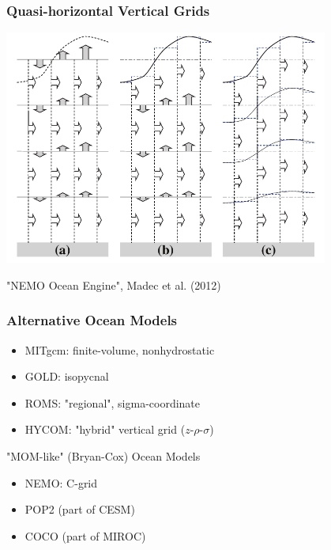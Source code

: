\documentclass[red]{beamer}
\begin{document}
\begin{frame}
    \frametitle{Quasi-horizontal Vertical Grids}
    
    \begin{center}
        \includegraphics[width=0.8\textwidth]{zstar.pdf}
    \end{center}
    
    {\tiny "NEMO Ocean Engine", Madec et al. (2012)}
\end{frame}

\begin{frame}
    \frametitle{Alternative Ocean Models}
    
    \begin{itemize}
        \item MITgcm: finite-volume, nonhydrostatic
        \item GOLD: isopycnal
        \item ROMS: "regional", sigma-coordinate
        \item HYCOM: "hybrid" vertical grid ($z$-$\rho$-$\sigma$)
    \end{itemize}
    
    "MOM-like" (Bryan-Cox) Ocean Models
    \begin{itemize}
        \item NEMO: C-grid
        \item POP2 (part of CESM)
        \item COCO (part of MIROC)
    \end{itemize}
\end{frame}

\end{document}
